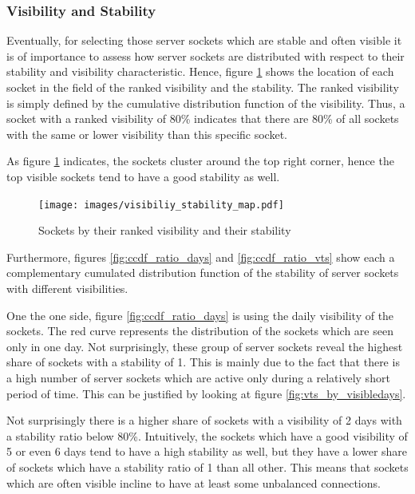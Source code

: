 \subsubsection{Visibility and Stability}
Eventually, for selecting those \glspl{server socket} which are stable and often
visible it is of importance to assess how \glspl{server socket} are distributed
with respect to their stability and visibility characteristic. Hence, figure
\ref{fig:rankedVisibility} shows the location of each socket in the field of the
ranked visibility and the stability. The ranked visibility is simply defined by
the cumulative distribution function of the visibility. Thus, a socket with a
ranked visibility of 80\% indicates that there are 80\% of all sockets with the
same or lower visibility than this specific socket.

As figure \ref{fig:rankedVisibility} indicates, the sockets cluster around the
top right corner, hence the top visible sockets tend to have a good stability as
well.

\begin{figure}
	[hb] \centering
	\texttt{[image: images/visibiliy\_stability\_map.pdf]}
	\caption{Sockets by their ranked visibility and their stability}
	\label{fig:rankedVisibility}
\end{figure}

Furthermore, figures \ref{fig:ccdf_ratio_days} and \ref{fig:ccdf_ratio_vts} show
each a complementary cumulated distribution function of the stability of server
sockets with different visibilities.

One the one side, figure \ref{fig:ccdf_ratio_days} is using the daily visibility
of the sockets. The red curve represents the distribution of the sockets which
are seen only in one day. Not surprisingly, these group of \glspl{server socket}
reveal the highest share of sockets with a stability of 1. This is mainly due to
the fact that there is a high number of \glspl{server socket} which are active
only during a relatively short period of time. This can be justified by looking
at figure \ref{fig:vts_by_visibledays}.

Not surprisingly there is a higher share of sockets with a visibility of 2 days
with a stability ratio below 80\%. Intuitively, the sockets which have a good
visibility of 5 or even 6 days tend to have a high stability as well, but they
have a lower share of sockets which have a stability ratio of 1 than all other.
This means that sockets which are often visible incline to have at least some
unbalanced connections.

